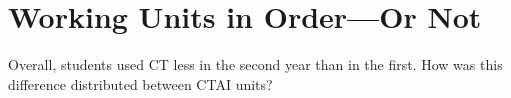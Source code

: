 \documentclass[12pt]{article}\usepackage[]{graphicx}\usepackage[]{color}
\begin{document}

\section{Working Units in Order---Or Not}\label{sec:order}

Overall, students used CT less in the second year than in the
first.
How was this difference distributed between CTAI units?
\end{document}
